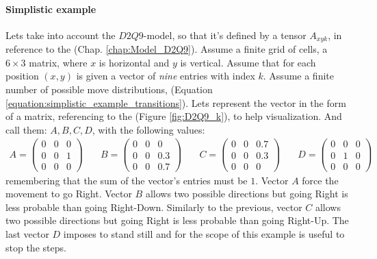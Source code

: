 \documentclass[class=article, crop=false]{standalone}
\begin{document}
\paragraph{Simplistic example}
Lets take into account the $D2Q9$-model, so that it's defined by a tensor $A_{x y k}$, in reference to the (Chap. \ref{chap:Model_D2Q9}).
Assume a finite grid of cells, a $6\times3$ matrix, where $x$ is horizontal and $y$ is vertical.
Assume that for each position $(x, y)$ is given a vector of \emph{nine} entries with index $k$.
Assume a finite number of possible move distributions, (Equation \ref{equation:simplistic_example_transitions}).
Lets represent the vector in the form of a matrix, referencing to the (Figure \ref{fig:D2Q9_k}), to help visualization.
And call them: $A, B, C, D$, with the following values:
\begin{equation}
\begin{split}
A=
\left(
\begin{array}{ccc}
 0 &  0 & 0  \\
 0 &  0 & 1  \\
 0 &  0 & 0  
\end{array}
\right)
\end{split}\quad
\begin{split}
B=
\left(
\begin{array}{ccc}
 0 &  0 & 0  \\
 0 &  0 & 0.3  \\
 0 &  0 & 0.7  
\end{array}
\right)
\end{split}\quad
\begin{split}
C=
\left(
\begin{array}{ccc}
 0 &  0 & 0.7  \\
 0 &  0 & 0.3  \\
 0 &  0 & 0  
\end{array}
\right)
\end{split}\quad
\begin{split}
D=
\left(
\begin{array}{ccc}
 0 &  0 & 0  \\
 0 &  1 & 0  \\
 0 &  0 & 0  
\end{array}
\right)
\end{split}
\label{equation:simplistic_example_transitions}
\end{equation}
remembering that the sum of the vector's entries must be $1$.
Vector $A$ force the movement to go Right.
Vector $B$ allows two possible directions but going Right is less probable than going Right-Down.
Similarly to the previous, vector $C$ allows two possible directions but going Right is less probable than going Right-Up.
The last vector $D$ imposes to stand still and for the scope of this example is useful to stop the steps.
\end{document}
